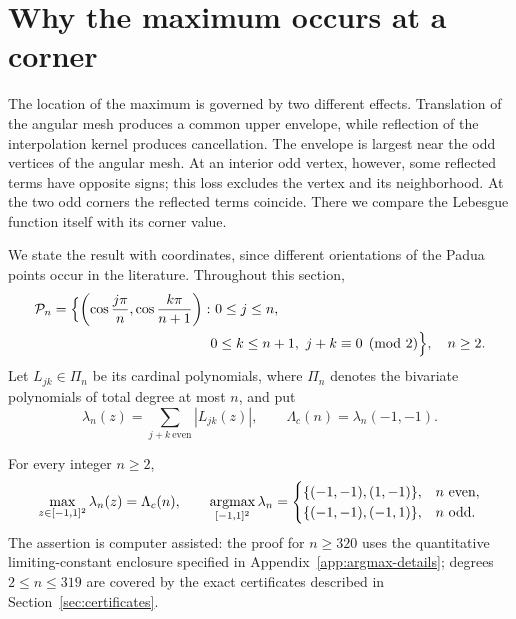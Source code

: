 \section{Why the maximum occurs at a corner}
\label{sec:argmax}

The location of the maximum is governed by two different effects.
Translation of the angular mesh produces a common upper envelope, while
reflection of the interpolation kernel produces cancellation.  The
envelope is largest near the odd vertices of the angular mesh.  At an
interior odd vertex, however, some reflected terms have opposite signs;
this loss excludes the vertex and its neighborhood.  At the two odd
corners the reflected terms coincide.  There we compare the Lebesgue
function itself with its corner value.

We state the result with coordinates, since different orientations of the
Padua points occur in the literature.  Throughout this section,
\begin{equation}
 \begin{split}
 \mathcal P_n=\Bigl\{\left(\cos\frac{j\pi}{n},
                  \cos\frac{k\pi}{n+1}\right):&\ 0\leq j\leq n,\\
 &0\leq k\leq n+1,\ j+k\equiv0\pmod2\Bigr\},\quad n\geq2.
 \end{split}                                         \label{eq:argmax-nodes}
\end{equation}
Let $L_{jk}\in\Pi_n$ be its cardinal polynomials, where $\Pi_n$ denotes
the bivariate polynomials of total degree at most $n$, and put
\[
 \lambda_n(z)=\sum_{j+k\ \text{even}}|L_{jk}(z)|,
 \qquad \Lambda_c(n)=\lambda_n(-1,-1).
\]

\begin{theorem}
\label{thm:argmax-all-degrees}
For every integer $n\geq2$,
\[
 \max_{z\in[-1,1]^2}\lambda_n(z)=\Lambda_c(n),
 \qquad
 \mathop{\rm argmax}_{[-1,1]^2}\lambda_n=
 \begin{cases}
 \{(-1,-1),(1,-1)\},&n\text{ even},\\
 \{(-1,-1),(-1,1)\},&n\text{ odd}.
 \end{cases}                                         \label{eq:argmax-exact-set}
\]
The assertion is computer assisted: the proof for $n\geq320$ uses the
quantitative limiting-constant enclosure specified in
Appendix~\ref{app:argmax-details}; degrees $2\leq n\leq319$ are covered
by the exact certificates described in Section~\ref{sec:certificates}.
\end{theorem}


